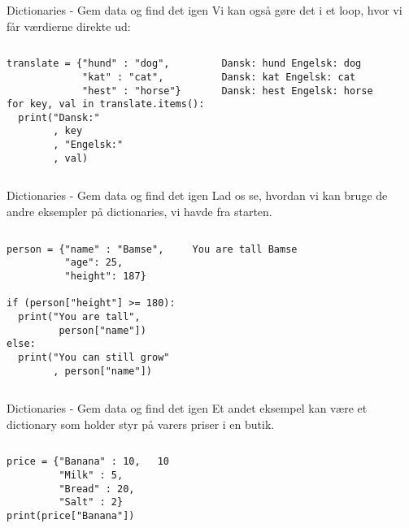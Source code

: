 \begin{frame}[fragile]{Dictionaries - Gem data og find det igen}
	Vi kan også gøre det i et loop, hvor vi får værdierne direkte ud:
	\begin{columns}
		\begin{lstlisting}[style=python]
translate = {"hund" : "dog", 
             "kat" : "cat", 
             "hest" : "horse"}
for key, val in translate.items():
  print("Dansk:"
        , key
        , "Engelsk:"
        , val)
		\end{lstlisting}
		
		\pause
		\begin{lstlisting}[style=python]
Dansk: hund Engelsk: dog
Dansk: kat Engelsk: cat
Dansk: hest Engelsk: horse
		\end{lstlisting}
	\end{columns}	
\end{frame}

\begin{frame}[fragile]{Dictionaries - Gem data og find det igen}
	Lad os se, hvordan vi kan bruge de andre eksempler på dictionaries, vi havde fra starten.
	
	\begin{columns}
		\column{0.5\textwidth}
		\begin{lstlisting}[style=python]
person = {"name" : "Bamse",
          "age": 25,
          "height": 187}

if (person["height"] >= 180):
  print("You are tall", 
         person["name"])
else:
  print("You can still grow"
        , person["name"])
		\end{lstlisting}
		
		\pause
		\column{0.35\textwidth}
		\begin{lstlisting}[style=python]
You are tall Bamse
		\end{lstlisting}
	\end{columns}	
\end{frame}

\begin{frame}[fragile]{Dictionaries - Gem data og find det igen}
	Et andet eksempel kan være et dictionary som holder styr på varers priser i en butik.
	\begin{columns}
		\begin{lstlisting}[style=python]
price = {"Banana" : 10,
         "Milk" : 5,
         "Bread" : 20,
         "Salt" : 2}
print(price["Banana"])
		\end{lstlisting}
		
		\pause
		\column{0.3\textwidth}
		\begin{lstlisting}[style=python]
10
		\end{lstlisting}
	\end{columns}	
\end{frame}

